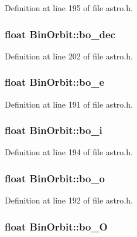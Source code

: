 Definition at line 195 of file astro.\-h.

\hypertarget{struct_bin_orbit_adbdb17536ddf22681e9d3ec9aa140ee2}{
\subsubsection[{bo\-\_\-dec}]{\setlength{\rightskip}{0pt plus 5cm}float Bin\-Orbit\-::bo\-\_\-dec}}\label{struct_bin_orbit_adbdb17536ddf22681e9d3ec9aa140ee2}


Definition at line 202 of file astro.\-h.

\hypertarget{struct_bin_orbit_a153e76ae7fbba6c5d51db5c849712fd7}{
\subsubsection[{bo\-\_\-e}]{\setlength{\rightskip}{0pt plus 5cm}float Bin\-Orbit\-::bo\-\_\-e}}\label{struct_bin_orbit_a153e76ae7fbba6c5d51db5c849712fd7}


Definition at line 191 of file astro.\-h.

\hypertarget{struct_bin_orbit_ac352c440ca03b4fb61318b7af937a272}{
\subsubsection[{bo\-\_\-i}]{\setlength{\rightskip}{0pt plus 5cm}float Bin\-Orbit\-::bo\-\_\-i}}\label{struct_bin_orbit_ac352c440ca03b4fb61318b7af937a272}


Definition at line 194 of file astro.\-h.

\hypertarget{struct_bin_orbit_a7ed2ce32869bece7d6f19ad4513c8ca1}{
\subsubsection[{bo\-\_\-o}]{\setlength{\rightskip}{0pt plus 5cm}float Bin\-Orbit\-::bo\-\_\-o}}\label{struct_bin_orbit_a7ed2ce32869bece7d6f19ad4513c8ca1}


Definition at line 192 of file astro.\-h.

\hypertarget{struct_bin_orbit_a4b329066d26ceae03acbcaf73b2eee9c}{
\subsubsection[{bo\-\_\-\-O}]{\setlength{\rightskip}{0pt plus 5cm}float Bin\-Orbit\-::bo\-\_\-\-O}}\label{struct_bin_orbit_a4b329066d26ceae03acbcaf73b2eee9c}


